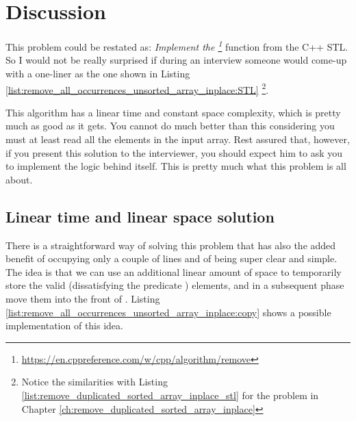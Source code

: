 \section{Discussion}
\label{remove_all_occurrences_unsorted_array_inplace:sec:discussion}
This problem could be restated as: \textit{Implement the
\footnote{\url{https://en.cppreference.com/w/cpp/algorithm/remove}}} function from
the C++ STL. So I would not be really surprised if during an interview someone would come-up with a
one-liner as the one shown in Listing \ref{list:remove_all_occurrences_unsorted_array_inplace:STL}
\footnote{Notice the similarities with Listing \ref{list:remove_duplicated_sorted_array_inplace_stl} for the problem in Chapter \ref{ch:remove_duplicated_sorted_array_inplace}}.




This algorithm has a linear time and constant space complexity, which is pretty much as good as it gets. You cannot do much better than this considering you must at least read all the elements in the input array. 
Rest assured that, however, if you present this solution to the interviewer, you should expect him to ask you to implement the logic behind 
 itself. This is pretty much what this problem is all about.

\subsection{Linear time and linear space solution}
\label{remove_all_occurrences_unsorted_array_inplace:sec:bruteforce}
There is a straightforward way of solving this problem that has also the added benefit of occupying
only a couple of lines and of being super clear and simple. The idea is that we can use an additional
linear amount of space to temporarily store the valid (dissatisfying the predicate 
) elements, and in a subsequent
phase move them into the front of 
. Listing \ref{list:remove_all_occurrences_unsorted_array_inplace:copy} shows a possible implementation of this idea.




